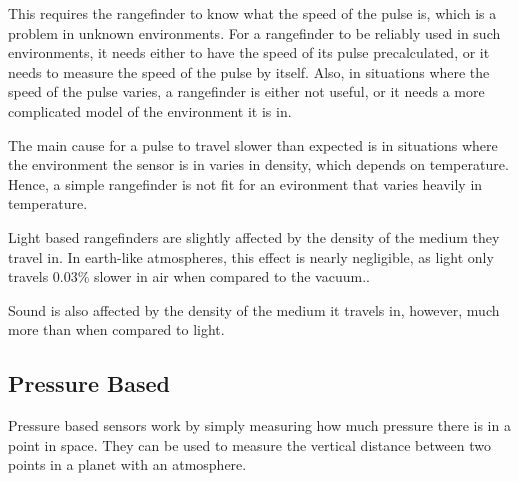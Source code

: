 This requires the rangefinder to know what the speed of the pulse is, which is a problem in unknown environments. For a rangefinder to be reliably used in such environments, it needs either to have the speed of its pulse precalculated, or it needs to measure the speed of the pulse by itself. Also, in situations where the speed of the pulse varies, a rangefinder is either not useful, or it needs a more complicated model of the environment it is in.

The main cause for a pulse to travel slower than expected is in situations where the environment the sensor is in varies in density, which depends on temperature\cite{refraction}. Hence, a simple rangefinder is not fit for an evironment that varies heavily in temperature.


Light based rangefinders are slightly affected by the density of the medium they travel in. In earth-like atmospheres, this effect is nearly negligible, as light only travels 0.03\% slower in air when compared to the vacuum.\cite{refraction}.

Sound is also affected by the density of the medium it travels in, however, much more than when compared to light\cite{speedOfSound}.

\subsection{Pressure Based}
Pressure based sensors work by simply measuring how much pressure there is in a point in space. They can be used to measure the vertical distance between two points in a planet with an atmosphere\cite{barometric1}\cite{barometric2}.
